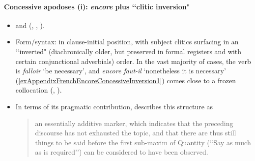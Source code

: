 \paragraph{Concessive apodoses (i): \textit{encore} plus \lq\lq clitic inversion"}
\label{appendixFrenchEncoreConcessiveConsequent1}
\begin{itemize}
	\item \textcite[s.v. \textit{encore}]{Dicctionnaire} and \citeauthor{MosegaardHansen2002} (\citeyear{MosegaardHansen2002}, \citeyear[193–197]{MosegaardHansen2008}, \citeyear[336–337]{MosegaardHansen2016}).
	\item Form/syntax: in clause-initial position, with subject clitics surfacing in an \lq\lq inverted" (diachronically older, but preserved in formal registers and with certain conjunctional adverbials) order. In the vast majority of cases, the verb is \textit{falloir} \lq be necessary', and \textit{encore faut-il} \lq nonetheless it is necessary' (\ref{exAppendixFrenchEncoreConcessiveInversion1}) comes close to a frozen collocation (\cite{MosegaardHansen2002},  \citeyear[193]{MosegaardHansen2008}).

	\item In terms of its pragmatic contribution, \textcite[196]{MosegaardHansen2008} describes this structure as
	\begin{quote} an essentially additive marker, which indicates that the preceding discourse has not exhausted the topic, and that there are thus still things to be said before the first sub-maxim of Quantity (\lq\lq Say as much as is required\rq\rq) can be considered to have been observed.\end{quote}
\end{itemize}

